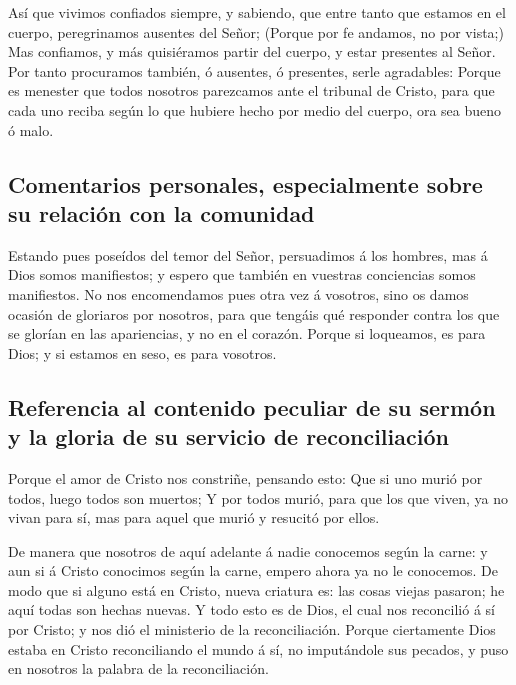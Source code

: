  Así que vivimos confiados siempre, y sabiendo, que entre
tanto que estamos en el cuerpo, peregrinamos ausentes del Señor;
 (Porque por fe andamos, no por vista;)  Mas
confiamos, y más quisiéramos partir del cuerpo, y estar presentes al
Señor.  Por tanto procuramos también, ó ausentes, ó
presentes, serle agradables:  Porque es menester que todos
nosotros parezcamos ante el tribunal de Cristo, para que cada uno reciba
según lo que hubiere hecho por medio del cuerpo, ora sea bueno ó malo.

\hypertarget{comentarios-personales-especialmente-sobre-su-relaciuxf3n-con-la-comunidad}{%
\subsection{Comentarios personales, especialmente sobre su relación con
la
comunidad}\label{comentarios-personales-especialmente-sobre-su-relaciuxf3n-con-la-comunidad}}

 Estando pues poseídos del temor del Señor, persuadimos á
los hombres, mas á Dios somos manifiestos; y espero que también en
vuestras conciencias somos manifiestos.  No nos
encomendamos pues otra vez á vosotros, sino os damos ocasión de
gloriaros por nosotros, para que tengáis qué responder contra los que se
glorían en las apariencias, y no en el corazón.  Porque si
loqueamos, es para Dios; y si estamos en seso, es para vosotros.

\hypertarget{referencia-al-contenido-peculiar-de-su-sermuxf3n-y-la-gloria-de-su-servicio-de-reconciliaciuxf3n}{%
\subsection{Referencia al contenido peculiar de su sermón y la gloria de
su servicio de
reconciliación}\label{referencia-al-contenido-peculiar-de-su-sermuxf3n-y-la-gloria-de-su-servicio-de-reconciliaciuxf3n}}

 Porque el amor de Cristo nos constriñe, pensando esto: Que
si uno murió por todos, luego todos son muertos;  Y por
todos murió, para que los que viven, ya no vivan para sí, mas para aquel
que murió y resucitó por ellos.

 De manera que nosotros de aquí adelante á nadie conocemos
según la carne: y aun si á Cristo conocimos según la carne, empero ahora
ya no le conocemos.  De modo que si alguno está en Cristo,
nueva criatura es: las cosas viejas pasaron; he aquí todas son hechas
nuevas.  Y todo esto es de Dios, el cual nos reconcilió á
sí por Cristo; y nos dió el ministerio de la reconciliación.
 Porque ciertamente Dios estaba en Cristo reconciliando el
mundo á sí, no imputándole sus pecados, y puso en nosotros la palabra de
la reconciliación.


